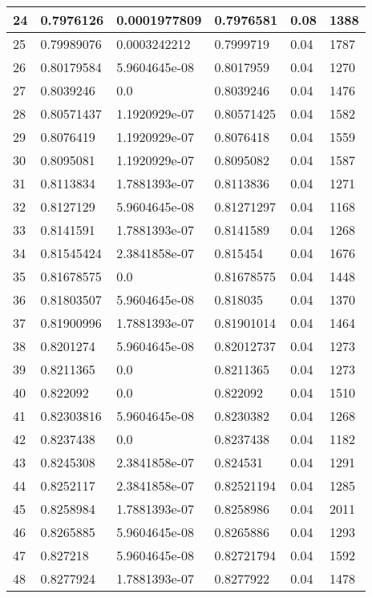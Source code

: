 \begin{longtable}{|l|l|l|l|l|l|}
24 & 0.7976126 & 0.0001977809 & 0.7976581 & 0.08 & 1388 \\ \hline 
25 & 0.79989076 & 0.0003242212 & 0.7999719 & 0.04 & 1787 \\ \hline 
26 & 0.80179584 & 5.9604645e-08 & 0.8017959 & 0.04 & 1270 \\ \hline 
27 & 0.8039246 & 0.0 & 0.8039246 & 0.04 & 1476 \\ \hline 
28 & 0.80571437 & 1.1920929e-07 & 0.80571425 & 0.04 & 1582 \\ \hline 
29 & 0.8076419 & 1.1920929e-07 & 0.8076418 & 0.04 & 1559 \\ \hline 
30 & 0.8095081 & 1.1920929e-07 & 0.8095082 & 0.04 & 1587 \\ \hline 
31 & 0.8113834 & 1.7881393e-07 & 0.8113836 & 0.04 & 1271 \\ \hline 
32 & 0.8127129 & 5.9604645e-08 & 0.81271297 & 0.04 & 1168 \\ \hline 
33 & 0.8141591 & 1.7881393e-07 & 0.8141589 & 0.04 & 1268 \\ \hline 
34 & 0.81545424 & 2.3841858e-07 & 0.815454 & 0.04 & 1676 \\ \hline 
35 & 0.81678575 & 0.0 & 0.81678575 & 0.04 & 1448 \\ \hline 
36 & 0.81803507 & 5.9604645e-08 & 0.818035 & 0.04 & 1370 \\ \hline 
37 & 0.81900996 & 1.7881393e-07 & 0.81901014 & 0.04 & 1464 \\ \hline 
38 & 0.8201274 & 5.9604645e-08 & 0.82012737 & 0.04 & 1273 \\ \hline 
39 & 0.8211365 & 0.0 & 0.8211365 & 0.04 & 1273 \\ \hline 
40 & 0.822092 & 0.0 & 0.822092 & 0.04 & 1510 \\ \hline 
41 & 0.82303816 & 5.9604645e-08 & 0.8230382 & 0.04 & 1268 \\ \hline 
42 & 0.8237438 & 0.0 & 0.8237438 & 0.04 & 1182 \\ \hline 
43 & 0.8245308 & 2.3841858e-07 & 0.824531 & 0.04 & 1291 \\ \hline 
44 & 0.8252117 & 2.3841858e-07 & 0.82521194 & 0.04 & 1285 \\ \hline 
45 & 0.8258984 & 1.7881393e-07 & 0.8258986 & 0.04 & 2011 \\ \hline 
46 & 0.8265885 & 5.9604645e-08 & 0.8265886 & 0.04 & 1293 \\ \hline 
47 & 0.827218 & 5.9604645e-08 & 0.82721794 & 0.04 & 1592 \\ \hline 
48 & 0.8277924 & 1.7881393e-07 & 0.8277922 & 0.04 & 1478 \\ \hline 

\end{longtable}
